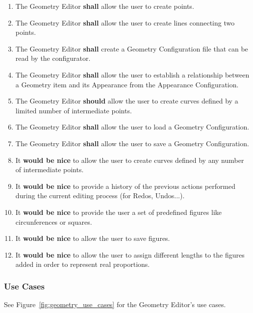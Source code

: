\begin{enumerate}
  \item The Geometry Editor \textbf{shall} allow the user to create points.
  \item The Geometry Editor \textbf{shall} allow the user to create lines connecting two points.    
  \item The Geometry Editor \textbf{shall} create a Geometry Configuration file that can be read by the configurator.
  \item The Geometry Editor \textbf{shall} allow the user to establish a relationship between a Geometry item and 
  its Appearance from the Appearance Configuration.
  \item The Geometry Editor \textbf{should} allow the user to create curves defined by a limited number of intermediate points.
  \item The Geometry Editor \textbf{shall} allow the user to load a Geometry Configuration.
  \item The Geometry Editor \textbf{shall} allow the user to save a Geometry Configuration.
  \item It \textbf{would be nice} to allow the user to create curves defined by any number of intermediate points.
  \item It \textbf{would be nice} to provide a history of the previous actions performed during the current editing process (for Redos, Undos...).
  \item It \textbf{would be nice} to provide the user a set of predefined figures like circunferences or squares.
  \item It \textbf{would be nice} to allow the user to save figures.
  \item It \textbf{would be nice} to allow the user to assign different lengths to the figures added in order to represent real proportions.
\end{enumerate}

\subsubsection{Use Cases}

See Figure~\ref{fig:geometry_use_cases} for the Geometry Editor's use cases.


